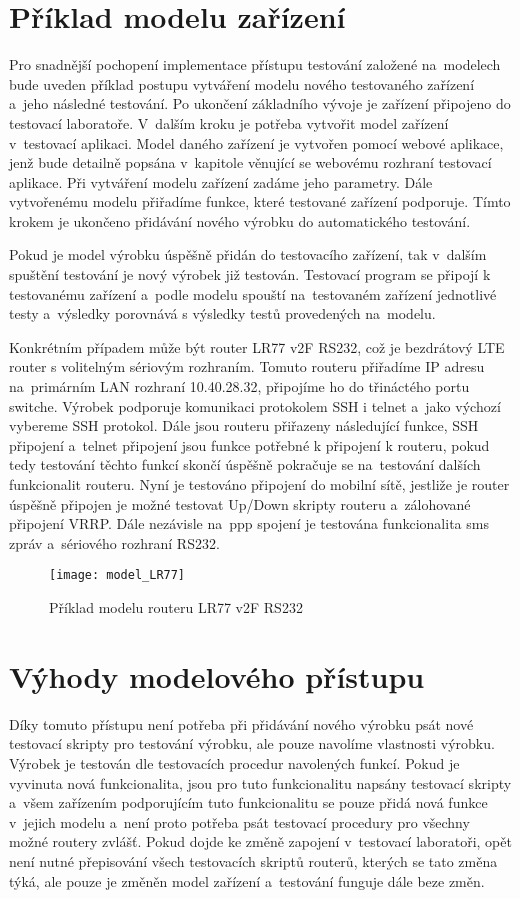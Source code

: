 \section{Příklad modelu zařízení}
Pro snadnější pochopení implementace přístupu testování založené na~modelech bude uveden příklad postupu vytváření modelu nového testovaného zařízení a~jeho následné testování. Po ukončení základního vývoje je zařízení připojeno do testovací laboratoře. V~dalším kroku je potřeba vytvořit model zařízení v~testovací aplikaci. Model daného zařízení je vytvořen pomocí webové aplikace, jenž bude detailně popsána v~kapitole věnující se webovému rozhraní testovací aplikace. Při vytváření modelu zařízení zadáme jeho parametry. Dále vytvořenému modelu přiřadíme funkce, které testované zařízení podporuje. Tímto krokem je ukončeno přidávání nového výrobku do automatického testování.

Pokud je model výrobku úspěšně přidán do testovacího zařízení, tak v~dalším spuštění testování je nový výrobek již testován. Testovací program se připojí k testovanému zařízení a~podle modelu spouští na~testovaném zařízení jednotlivé testy a~výsledky porovnává s výsledky testů provedených na~modelu.

Konkrétním případem může být router LR77 v2F RS232, což je bezdrátový LTE router s volitelným sériovým rozhraním. Tomuto routeru přiřadíme IP adresu na~primárním LAN rozhraní 10.40.28.32, připojíme ho do třináctého portu switche. Výrobek podporuje komunikaci protokolem SSH i telnet a~jako výchozí vybereme SSH protokol. Dále jsou routeru přiřazeny následující funkce, SSH připojení a~telnet připojení jsou funkce potřebné k připojení k routeru, pokud tedy testování těchto funkcí skončí úspěšně pokračuje se na~testování dalších funkcionalit routeru. Nyní je testováno připojení do mobilní sítě, jestliže je router úspěšně připojen je možné testovat Up/Down skripty routeru a~zálohované připojení VRRP. Dále nezávisle na~ppp spojení je testována funkcionalita sms zpráv a~sériového rozhraní RS232.

\begin{figure}[h]
  \centering
  \texttt{[image: model\_LR77]}
  \caption{Příklad modelu routeru LR77 v2F RS232}
  \label{fig:model_LR77}
\end{figure}

\section{Výhody modelového přístupu}
Díky tomuto přístupu není potřeba při přidávání nového výrobku psát nové testovací skripty pro testování výrobku, ale pouze navolíme vlastnosti výrobku. Výrobek je testován dle testovacích procedur navolených funkcí. Pokud je vyvinuta nová funkcionalita, jsou pro tuto funkcionalitu napsány testovací skripty a~všem zařízením podporujícím tuto funkcionalitu se pouze přidá nová funkce v~jejich modelu a~není proto potřeba psát testovací procedury pro všechny možné routery zvlášť. Pokud dojde ke změně zapojení v~testovací laboratoři, opět není nutné přepisování všech testovacích skriptů routerů, kterých se tato změna týká, ale pouze je změněn model zařízení a~testování funguje dále beze změn.

\endinput

